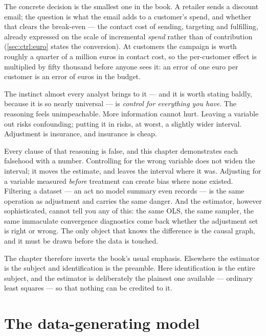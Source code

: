 The concrete decision is the smallest one in the book. A retailer sends a discount email; the
question is what the email adds to a customer's spend, and whether that clears the
\eur{\nbFiveCost} break-even --- the contact cost of sending, targeting and fulfilling, already
expressed on the scale of incremental \emph{spend} rather than of contribution
(\cref{sec:ctrl:euro} states the conversion). At \nbFiveCampaignN{} customers the
campaign is worth roughly a quarter of a million euros in contact cost, so the per-customer
effect is multiplied by fifty thousand before anyone sees it: an error of one euro per customer
is an error of \nbFiveCampaignN{} euros in the budget.

The instinct almost every analyst brings to it --- and it is worth stating baldly, because it is
so nearly universal --- is \emph{control for everything you have}. The reasoning feels
unimpeachable. More information cannot hurt. Leaving a variable out risks confounding; putting
it in risks, at worst, a slightly wider interval. Adjustment is insurance, and insurance is
cheap.

Every clause of that reasoning is false, and this chapter demonstrates each falsehood with a
number. Controlling for the wrong variable does not widen the interval; it moves the estimate,
and leaves the interval where it was. Adjusting for a variable measured \emph{before} treatment
can create bias where none existed. Filtering a dataset --- an act no model summary even
records --- is the same operation as adjustment and carries the same danger. And the estimator,
however sophisticated, cannot tell you any of this: the same OLS, the same sampler, the same
immaculate convergence diagnostics come back whether the adjustment set is right or wrong. The
only object that knows the difference is the causal graph, and it must be drawn before the data
is touched.

The chapter therefore inverts the book's usual emphasis. Elsewhere the estimator is the subject
and identification is the preamble. Here identification is the entire subject, and the estimator
is deliberately the plainest one available --- ordinary least squares --- so that nothing can be
credited to it.

\section{The data-generating model}
\label{sec:ctrl:dgm}

